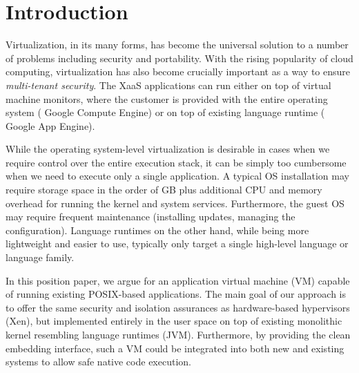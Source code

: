 \section{Introduction}
\label{sec:intro}



Virtualization, in its many forms, has become the universal solution to
a number of problems including security and portability.  With the
rising popularity of cloud computing, virtualization has also become
crucially important as a way to ensure \emph{multi-tenant security}. The
XaaS applications can run either on top of virtual machine monitors,
where the customer is provided with the entire operating system (\eg
Google Compute Engine) or on top of existing language runtime (\eg
Google App Engine).

While the operating system-level virtualization is desirable in cases
when we require control over the entire execution stack, it can be
simply too cumbersome when we need to execute only a single application.
A typical OS installation may require storage space in the order of GB
plus additional CPU and memory overhead for running the kernel and
system services. Furthermore, the guest OS may require frequent
maintenance (\eg installing updates, managing the configuration).
Language runtimes on the other hand, while being more lightweight and
easier to use, typically only target a single high-level language or
language family. 

In this position paper, we argue for an application virtual machine (VM)
capable of running existing POSIX-based applications. The main goal of
our approach is to offer the same security and isolation assurances as
hardware-based hypervisors (\eg Xen), but implemented entirely in the
user space on top of existing monolithic kernel resembling language
runtimes (\eg JVM). Furthermore, by providing the clean embedding
interface, such a VM could be integrated into both new and existing
systems to allow safe native code execution.


